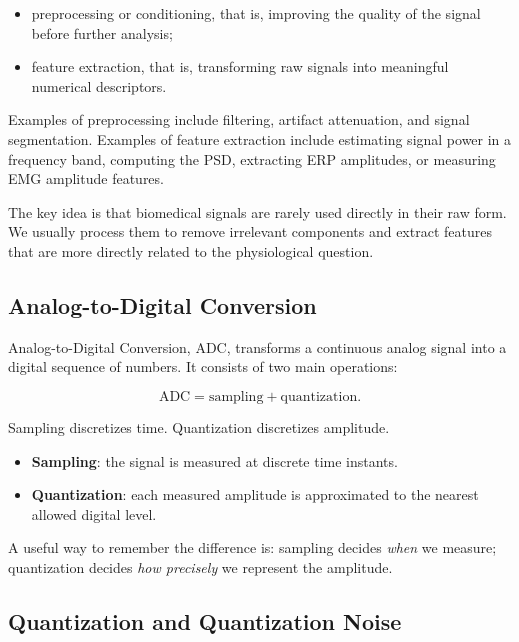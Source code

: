 \begin{itemize}[noitemsep]
    \item preprocessing or conditioning, that is, improving the quality of the signal before further analysis;
    \item feature extraction, that is, transforming raw signals into meaningful numerical descriptors.
\end{itemize}

Examples of preprocessing include filtering, artifact attenuation, and signal segmentation. Examples of feature extraction include estimating signal power in a frequency band, computing the PSD, extracting ERP amplitudes, or measuring EMG amplitude features.

\begin{authornote}
The key idea is that biomedical signals are rarely used directly in their raw form. We usually process them to remove irrelevant components and extract features that are more directly related to the physiological question.
\end{authornote}

\subsection{Analog-to-Digital Conversion}

Analog-to-Digital Conversion, ADC, transforms a continuous analog signal into a digital sequence of numbers. It consists of two main operations:

\[
\text{ADC} =
\text{sampling}
+
\text{quantization}.
\]

Sampling discretizes time. Quantization discretizes amplitude.

\begin{itemize}[noitemsep]
    \item \textbf{Sampling}: the signal is measured at discrete time instants.
    \item \textbf{Quantization}: each measured amplitude is approximated to the nearest allowed digital level.
\end{itemize}

\begin{authornote}
A useful way to remember the difference is: sampling decides \emph{when} we measure; quantization decides \emph{how precisely} we represent the amplitude.
\end{authornote}

\subsection{Quantization and Quantization Noise}


